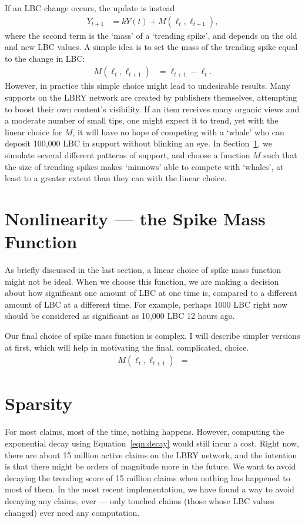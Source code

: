 \documentclass[a4paper, 12pt]{article}
\begin{document}
If an LBC change occurs, the update is instead
\begin{align}
Y_{t+1} &= kY(t) + M(\ell_t, \ell_{t+1}), \label{eqn:decay_with_spike}
\end{align}
where the second term is the `mass' of a `trending spike', and depends on
the old and new LBC values. A simple idea is to set the mass of the trending
spike equal to the change in LBC:
\begin{align}
M(\ell_t, \ell_{t+1}) &= \ell_{t+1} - \ell_t.
\end{align}
However, in practice this simple choice might lead to undesirable results.
Many supports on the LBRY network are created by publishers themselves,
attempting to boost their own content's visibility. If an item receives
many organic views and a moderate number of small tips, one might expect it
to trend, yet with the linear choice for $M$, it will have no hope of
competing with a `whale' who can deposit 100,000 LBC in support without
blinking an eye. In Section~\ref{sec:spike_mass}, we simulate several
different patterns of support, and choose a function $M$ such that
the size of trending spikes makes `minnows' able to compete with `whales',
at least to a greater extent than they can with the linear choice.

\section{Nonlinearity --- the Spike Mass Function}\label{sec:spike_mass}
As briefly discussed in the last section, a linear choice of spike mass
function might not be ideal. When we choose this function, we are making
a decision about how significant one amount of LBC at one time is, compared
to a different amount of LBC at a different time. For example, perhaps
1000 LBC right now should be considered as
significant as 10,000 LBC 12 hours ago.

Our final choice of spike mass function is complex. I will describe simpler
versions at first, which will help in motivating the final, complicated, choice.
\begin{align}
M(\ell_t, \ell_{t+1}) &=

\end{align}

\section{Sparsity}
For most claims, most of the time, nothing happens. However, computing the
exponential decay using Equation~\ref{eqn:decay} would still incur a cost.
Right now, there are about 15 million active claims on the LBRY network,
and the intention is that there might be orders of magnitude more in the
future. We want to avoid decaying the trending score of 15 million claims
when nothing has happened to most of them. In the most recent implementation,
we have found a way to avoid decaying any claims, ever --- only touched claims
(those whose LBC values changed) ever need any computation.
\end{document}
